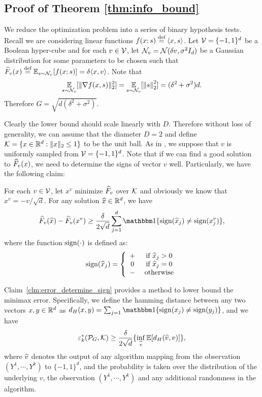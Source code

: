 \subsection{Proof of Theorem \ref{thm:info_bound}}
We reduce the optimization problem into a series of binary hypothesis tests.
Recall we are considering linear functions $f(x;s)\stackrel{{\text{def}}}{=}\langle x,s\rangle$.
Let $\mathcal V=\{-1,1\}^d$ be a Boolean hyper-cube and for each $v\in \mathcal V$, let $\mathcal N_{v}=\mathcal N(\delta v,\sigma^2I_{d})$ be a Gaussian distribution for some parameters to be chosen such that $\widehat{F}_v(x)\stackrel{{\text{def}}}{=} \operatorname*{\mathbb{E}}_{s\sim\mathcal N_v}[f(x;s)]=\delta\langle x,v\rangle$. Note that $$\operatorname*{\mathbb{E}}_{s\sim \mathcal N_v}[\|\nabla f(x,s)\|_2^2]=\operatorname*{\mathbb{E}}_{s\sim \mathcal N_v}[\left\lVert s\right\rVert_2^2]=(\delta^2+\sigma^2)d.$$ Therefore $G=\sqrt{d(\delta^2+\sigma^2)}.$

Clearly the lower bound should scale linearly with $D$. Therefore without loss of generality, we can assume that the diameter $D=2$ and define $\mathcal K=\{x\in\mathbb{R}^d:\|x\|_2\leq 1\}$ to be the unit ball.
As in \cite{ACCD12}, we suppose that $v$ is uniformly sampled from $\mathcal V=\{-1,1\}^d$.
Note that if we can find a good solution to $\widehat{F}_v(x)$, we need to determine the signs of vector $v$ well. Particularly, we have the following claim:
\begin{claim}
\label{clm:error_determine_sign}
For each $v\in \mathcal V$, let $x^v$ minimize $\widehat{F}_v$ over $\mathcal K$ and obviously we know that $x^v=-v/\sqrt{d}$. 
For any solution $\widehat{x}\in \mathbb{R}^d$, we have 
\begin{align*}
    \HF_v(\hat{x})-\HF_v(x^v)\geq\frac{\delta}{2\sqrt{d}}
    \sum_{j=1}^{d}\indicator\{\sign(\hat{x}_j)\neq \sign(x^v_j) 
    \},
\end{align*}
where the function $\mathrm{sign}(\cdot)$ is defined as:
\begin{align*}
    \mathrm{sign}(\widehat{x}_j)=\left\{\begin{array}{cc}
       + &  \text{ if } \widehat{x}_j>0 \\
         0 & \text{ if } \widehat{x}_j=0\\
         - & \text{ otherwise}
         \end{array}
         \right.
\end{align*}
\end{claim}

Claim~\ref{clm:error_determine_sign} provides a method to lower bound the minimax error.
Specifically, 
we define the hamming distance between any two vectors $x,y\in\mathbb{R}^d$ as $d_H(x,y)=\sum_{j=1}\indicator\{\sign(x_j)\neq \sign(y_j)\}$, and
we have
\begin{align}
\label{eq:minimax_to_testing}
    \varepsilon_k^*(\mathcal P_G,\mathcal K)\geq \frac{\delta}{2\sqrt{d}}\{\inf_{\widehat{v}}\operatorname*{\mathbb{E}}[d_H(\widehat{v},v)]\},
\end{align}
where $\widehat{v}$ denotes the output of any algorithm mapping from the observation $(Y^1,\cdots,Y^k)$ to $\{-1,1\}^d$, and the probability is taken over the distribution of the underlying $v$, the observation $(Y^1,\cdots,Y^k) $ and any additional randomness in the algorithm.

